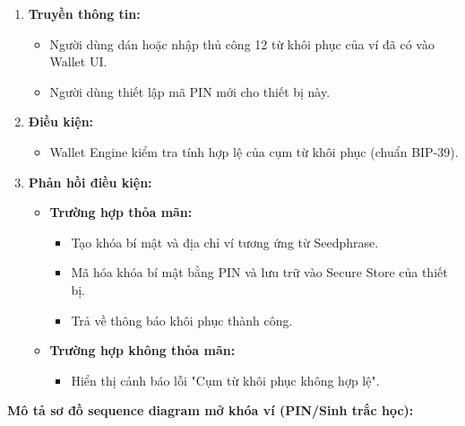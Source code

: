 \documentclass[a4paper]{report}
\begin{document}
\begin{enumerate}
    \item \textbf{Truyền thông tin:}
    \begin{itemize}
        \item Người dùng dán hoặc nhập thủ công 12 từ khôi phục của ví đã có vào Wallet UI.
        \item Người dùng thiết lập mã PIN mới cho thiết bị này.
    \end{itemize}

    \item \textbf{Điều kiện:}
    \begin{itemize}
        \item Wallet Engine kiểm tra tính hợp lệ của cụm từ khôi phục (chuẩn BIP-39).
    \end{itemize}

    \item \textbf{Phản hồi điều kiện:}
    \begin{itemize}
        \item \textbf{Trường hợp thỏa mãn:}
        \begin{itemize}
            \item Tạo khóa bí mật và địa chỉ ví tương ứng từ Seedphrase.
            \item Mã hóa khóa bí mật bằng PIN và lưu trữ vào Secure Store của thiết bị.
            \item Trả về thông báo khôi phục thành công.
        \end{itemize}

        \item \textbf{Trường hợp không thỏa mãn:}
        \begin{itemize}
            \item Hiển thị cảnh báo lỗi "Cụm từ khôi phục không hợp lệ".
        \end{itemize}
    \end{itemize}
\end{enumerate}

\textbf{Mô tả sơ đồ sequence diagram mở khóa ví (PIN/Sinh trắc học):}
\end{document}
